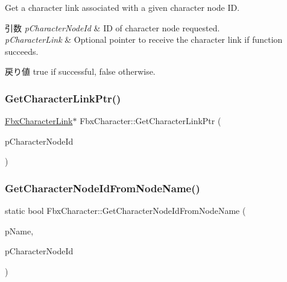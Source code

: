 Get a character link associated with a given character node ID. 
\begin{DoxyParams}{引数}
{\em p\+Character\+Node\+Id} & ID of character node requested. \\
\hline
{\em p\+Character\+Link} & Optional pointer to receive the character link if function succeeds. \\
\hline
\end{DoxyParams}
\begin{DoxyReturn}{戻り値}
{\ttfamily true} if successful, {\ttfamily false} otherwise. 
\end{DoxyReturn}
\mbox{\label{class_fbx_character_a4973b648e1127a4d2e22f226b908d272}} 
\subsubsection{\texorpdfstring{Get\+Character\+Link\+Ptr()}{GetCharacterLinkPtr()}}
{\footnotesize\ttfamily \hyperlink{class_fbx_character_link}{Fbx\+Character\+Link}$\ast$ Fbx\+Character\+::\+Get\+Character\+Link\+Ptr (\begin{DoxyParamCaption}\item[{\hyperlink{class_fbx_character_ad75bf42026e435ac0ff4d7ece2317be4}{E\+Node\+Id}}]{p\+Character\+Node\+Id }\end{DoxyParamCaption})}

\mbox{\label{class_fbx_character_af7a49eb6a3936fc9d45d734e23d9ab1e}} 
\subsubsection{\texorpdfstring{Get\+Character\+Node\+Id\+From\+Node\+Name()}{GetCharacterNodeIdFromNodeName()}}
{\footnotesize\ttfamily static bool Fbx\+Character\+::\+Get\+Character\+Node\+Id\+From\+Node\+Name (\begin{DoxyParamCaption}\item[{const char $\ast$}]{p\+Name,  }\item[{\hyperlink{class_fbx_character_ad75bf42026e435ac0ff4d7ece2317be4}{E\+Node\+Id} \&}]{p\+Character\+Node\+Id }\end{DoxyParamCaption})\hspace{0.3cm}{\ttfamily [static]}}

